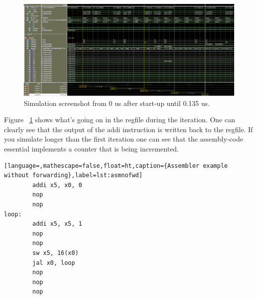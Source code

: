 \documentclass[11pt,a4paper,titlepage,oneside]{article}
\begin{document}
\begin{figure}[ht!]
	\centering
	\includegraphics[width=1.0\linewidth]{fig/regfile_0_to_0_135.png}
	\caption{Simulation screenshot from 0 us after start-up until 0.135 us.}
	\label{fig:regf}
\end{figure}

Figure ~\ref{fig:regf} shows what's going on in the regfile during the iteration. One can clearly see
that the output of the addi instruction is written back to the regfile. If you simulate longer than the 
first iteration one can see that the assembly-code essential implements a counter that is being
incremented. 


\begin{lstlisting}[language=,mathescape=false,float=ht,caption={Assembler example without forwarding},label=lst:asmnofwd]
        addi x5, x0, 0
        nop
        nop
loop:
        addi x5, x5, 1
        nop
        nop
        sw x5, 16(x0)
        jal x0, loop
        nop
        nop
        nop
\end{lstlisting}
\end{document}

